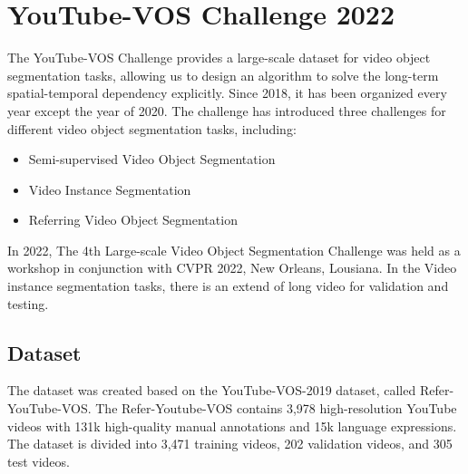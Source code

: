 \section{YouTube-VOS Challenge 2022}
\label{sec:rvos_ytvos}
The YouTube-VOS Challenge provides a large-scale dataset for video object segmentation tasks, allowing us to design an algorithm to solve the long-term spatial-temporal dependency explicitly. Since 2018, it has been organized every year except the year of 2020. The challenge has introduced three challenges for different video object segmentation tasks, including:
\begin{itemize}
    \item Semi-supervised Video Object Segmentation
    \item Video Instance Segmentation
    \item Referring Video Object Segmentation
\end{itemize}

In 2022, The 4th Large-scale Video Object Segmentation Challenge was held as a workshop in conjunction with CVPR 2022, New Orleans, Lousiana. In the Video instance segmentation tasks, there is an extend of long video for validation and testing. 

\subsection{Dataset}
The dataset was created based on the YouTube-VOS-2019 dataset, called Refer-YouTube-VOS. 
The Refer-Youtube-VOS contains 3,978 high-resolution YouTube videos with 131k high-quality manual annotations and 15k language expressions. The dataset is divided into 3,471 training videos, 202 validation videos, and 305 test videos.

